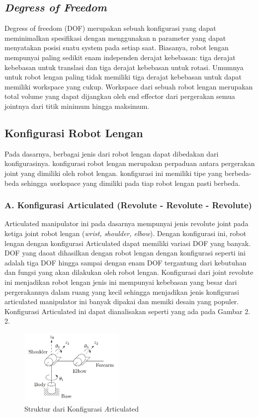 \subsection{\emph{Degress of Freedom }}
Degress of freedom (DOF) merupakan sebuah konfigurasi yang dapat meminimalkan spesifikasi dengan menggunakan n parameter yang dapat menyatakan posisi suatu system pada setiap saat. Biasanya, robot lengan mempunyai paling sedikit enam independen derajat kebebasan: tiga derajat kebebasan untuk translasi dan tiga derajat kebebasan untuk rotasi. Umumnya untuk robot lengan paling tidak memiliki tiga derajat kebebasan untuk dapat memiliki workspace yang cukup. Workspace dari sebuah robot lengan merupakan total volume yang dapat dijangkau oleh end effector dari pergerakan semua jointnya dari titik minimum hingga maksimum. 

\subsection{Konfigurasi Robot Lengan}
Pada dasarnya, berbagai jenis dari robot lengan dapat dibedakan dari konfigurasinya. konfigurasi robot lengan merupakan perpaduan antara pergerakan joint yang dimiliki oleh robot lengan. konfigurasi ini memiliki tipe yang berbeda-beda sehingga \emph workspace yang dimiliki pada tiap robot lengan pasti berbeda.

\subsubsection{A. Konfigurasi Articulated (Revolute - Revolute - Revolute)} 
Articulated manipulator ini pada dasarnya mempunyai jenis revolute joint pada ketiga joint robot lengan (\emph {wrist, shoulder, elbow}). Dengan konfigurasi ini, robot lengan dengan konfigurasi Articulated dapat memiliki variasi DOF yang banyak. DOF yang daoat dihasilkan dengan robot lengan dengan konfigurasi seperti ini adalah tiga DOF hingga sampai dengan enam DOF tergantung dari kebutuhan dan fungsi yang akan dilakukan oleh robot lengan. Konfigurasi dari joint revolute ini menjadikan robot lengan jenis ini mempunyai kebebasan yang besar dari pergerakannya dalam ruang yang kecil sehingga menjadikan jenis konfigurasi articulated manipulator ini banyak dipakai dan memiki desain yang populer. Konfigurasi Articulated ini dapat dianalisakan seperti yang ada pada Gambar 2. 2.
	\begin{figure}[H]
	\centering
	\includegraphics[width=5cm]{gambar/articulated.jpg}
	\caption{Struktur dari Konfigurasi \emph Articulated}
\end{figure}
